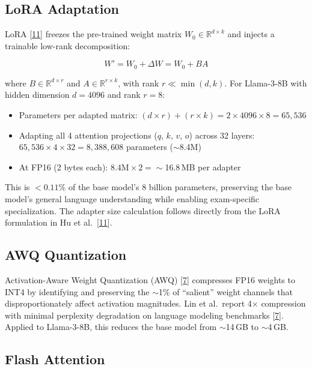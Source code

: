 \documentclass[12pt]{article}
\begin{document}
\subsection{LoRA Adaptation}
\label{sec:lora}

LoRA [\hyperlink{ref11}{11}] freezes the pre-trained weight matrix $W_0 \in \mathbb{R}^{d \times k}$ and injects a trainable low-rank decomposition:

\begin{equation}
    W' = W_0 + \Delta W = W_0 + BA
    \label{eq:lora}
\end{equation}

\noindent where $B \in \mathbb{R}^{d \times r}$ and $A \in \mathbb{R}^{r \times k}$, with rank $r \ll \min(d, k)$. For Llama-3-8B with hidden dimension $d = 4096$ and rank $r = 8$:

\begin{itemize}[leftmargin=*]
    \item Parameters per adapted matrix: $(d \times r) + (r \times k) = 2 \times 4096 \times 8 = 65{,}536$
    \item Adapting all 4 attention projections ($q$, $k$, $v$, $o$) across 32 layers: $65{,}536 \times 4 \times 32 = 8{,}388{,}608$ parameters ($\sim$8.4M)
    \item At FP16 (2 bytes each): $8.4\text{M} \times 2 = \sim$16.8\,MB per adapter
\end{itemize}

\noindent This is $< 0.11\%$ of the base model's 8 billion parameters, preserving the base model's general language understanding while enabling exam-specific specialization. The adapter size calculation follows directly from the LoRA formulation in Hu et al.\ [\hyperlink{ref11}{11}].

\subsection{AWQ Quantization}

Activation-Aware Weight Quantization (AWQ) [\hyperlink{ref7}{7}] compresses FP16 weights to INT4 by identifying and preserving the $\sim$1\% of ``salient'' weight channels that disproportionately affect activation magnitudes. Lin et al.\ report 4$\times$ compression with minimal perplexity degradation on language modeling benchmarks [\hyperlink{ref7}{7}]. Applied to Llama-3-8B, this reduces the base model from $\sim$14\,GB to $\sim$4\,GB.

\subsection{Flash Attention}
\end{document}
